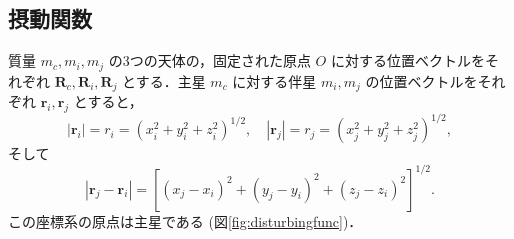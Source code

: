 \documentclass[11pt,a4paper,oneside,onecolumn]{jreport}
\begin{document}
\subsection{摂動関数}
質量 $m_c, m_i, m_j$ の3つの天体の，固定された原点 $O$ に対する位置ベクトルをそれぞれ ${\bm R}_c, {\bm R}_i, {\bm R}_j$ とする．主星 $m_c$ に対する伴星 $m_i, m_j$ の位置ベクトルをそれぞれ ${\bm r}_i, {\bm r}_j$ とすると，
\begin{equation}
|{\bm r}_i| = r_i = (x_i^2 + y_i^2 + z_i^2)^{1/2}, \quad |{\bm r}_j| = r_j = (x_j^2 + y_j^2 + z_j^2)^{1/2},
\end{equation}
そして
\begin{equation}
|{\bm r}_j- {\bm r}_i| = \left[ (x_j - x_i)^2 + (y_j - y_i)^2 + (z_j - z_i)^2 \right]^{1/2}.
\end{equation}
この座標系の原点は主星である (図\ref{fig:disturbingfunc})．
\end{document}
